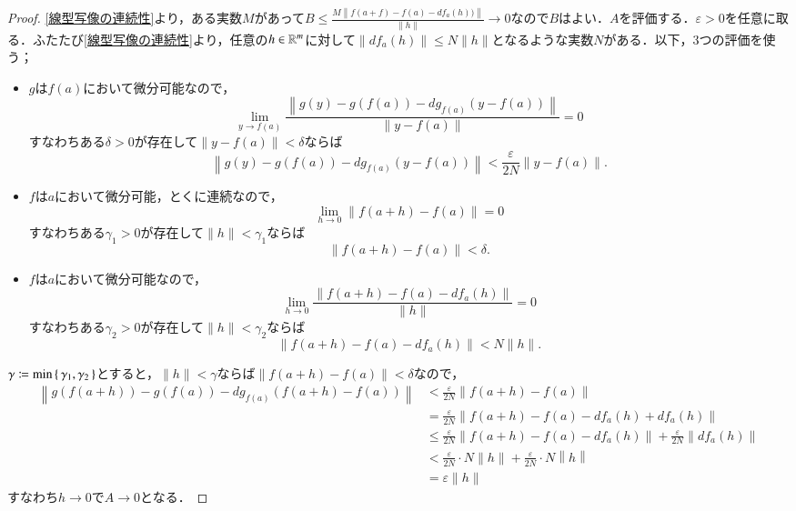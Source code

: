 \begin{proof}
\cref{線型写像の連続性}より，ある実数$M$があって$B \leq \frac{M \left\|f(a+f) - f(a) -df_a(h)) \right\|}{\|h\|} \to 0$なので$B$はよい．$A$を評価する．$\varepsilon>0$を任意に取る．ふたたび\cref{線型写像の連続性}より，任意の$h \in \mathbb{R}^m$に対して$\|df_{a}(h)\| \leq N\|h\|$となるような実数$N$がある．以下，3つの評価を使う；
\begin{itemize}
\item $g$は$f(a)$において微分可能なので，
\begin{equation}
\lim_{y \to f(a)}\frac{\left\|g (y) - g ( f(a) ) - dg_{f(a)} (y - f(a))\right\|}{\|y - f(a)\|}=0
\end{equation}すなわちある$\delta >0$が存在して$\|y - f(a)\| < \delta$ならば
\begin{equation}
\left\|g (y) - g ( f(a) ) - dg_{f(a)} (y - f(a))\right\| < \frac{\varepsilon}{2N} \|y - f(a)\|.
\end{equation}
\item $f$は$a$において微分可能，とくに連続なので，
\begin{equation}
\lim_{h \to 0} \left\|f (a+h) - f(a) \right\|=0
\end{equation}すなわちある$\gamma_1 >0$が存在して$\|h\|< \gamma_1$ならば
\begin{equation}
\|f(a+h) - f(a)\| < \delta.
\end{equation}
\item $f$は$a$において微分可能なので，
\begin{equation}
\lim_{h \to 0} \frac{\left\|f(a+h) - f(a)- df_{a} (h)\right\|}{\|h\|}=0
\end{equation}すなわちある$\gamma_2 >0$が存在して$\|h\|< \gamma_2$ならば
\begin{equation}
\left\|f(a+h) - f(a)- df_{a} (h)\right\| < N \|h\|.
\end{equation}
\end{itemize}
$\gamma \coloneqq \min \set{\gamma_1, \gamma_2}$とすると，$\|h\| < \gamma$ならば$\|f(a+h)-f(a)\| < \delta$なので，
\begin{align}
\left\|g (f(a+h)) - g ( f(a) ) - dg_{f(a)} (f(a+h) - f(a))\right\| &< \frac{\varepsilon}{2N} \left\|f (a+h) - f(a) \right\| \\
&=\frac{\varepsilon}{2N} \left\|f (a+h) - f(a) - df_a(h) + df_a(h) \right\| \\
&\leq \frac{\varepsilon}{2N} \left\|f (a+h) - f(a) - df_a(h)\right\| + \frac{\varepsilon}{2N} \left\|df_a(h) \right\| \\
&< \frac{\varepsilon}{2N} \cdot N \|h\| + \frac{\varepsilon}{2N}\cdot N \left\|h \right\| \\
&= \varepsilon \|h\|
\end{align}
すなわち$h\to 0$で$A \to 0$となる．
\end{proof}

